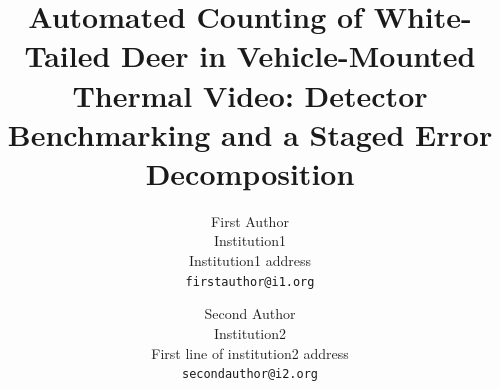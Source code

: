 \documentclass[10pt,twocolumn,letterpaper]{article}
\title{Automated Counting of White-Tailed Deer in Vehicle-Mounted\\Thermal Video: Detector Benchmarking and a Staged Error Decomposition}
\author{First Author\\
Institution1\\
Institution1 address\\
{\tt\small firstauthor@i1.org}
\and
Second Author\\
Institution2\\
First line of institution2 address\\
{\tt\small secondauthor@i2.org}
}
\begin{document}
\maketitle










{
    \small
    
    
}


\end{document}

